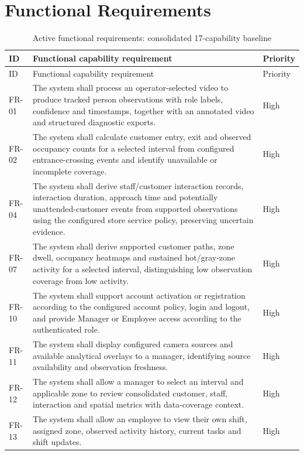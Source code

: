 \section{Functional Requirements}
\begin{longtable}{P{0.10\textwidth}P{0.68\textwidth}P{0.12\textwidth}}
\caption{Active functional requirements: consolidated 17-capability baseline}\label{tab:active-fr}\\
\toprule
ID & Functional capability requirement & Priority\\
\midrule
\endfirsthead
\toprule
ID & Functional capability requirement & Priority\\
\midrule
\endhead
FR-01 & The system shall process an operator-selected video to produce tracked person observations with role labels, confidence and timestamps, together with an annotated video and structured diagnostic exports. & High\\
FR-02 & The system shall calculate customer entry, exit and observed occupancy counts for a selected interval from configured entrance-crossing events and identify unavailable or incomplete coverage. & High\\
FR-04 & The system shall derive staff/customer interaction records, interaction duration, approach time and potentially unattended-customer events from supported observations using the configured store service policy, preserving uncertain evidence. & High\\
FR-07 & The system shall derive supported customer paths, zone dwell, occupancy heatmaps and sustained hot/gray-zone activity for a selected interval, distinguishing low observation coverage from low activity. & High\\
FR-10 & The system shall support account activation or registration according to the configured account policy, login and logout, and provide Manager or Employee access according to the authenticated role. & High\\
FR-11 & The system shall display configured camera sources and available analytical overlays to a manager, identifying source availability and observation freshness. & High\\
FR-12 & The system shall allow a manager to select an interval and applicable zone to review consolidated customer, staff, interaction and spatial metrics with data-coverage context. & High\\
FR-13 & The system shall allow an employee to view their own shift, assigned zone, observed activity history, current tasks and shift updates. & High\\

\end{longtable}
